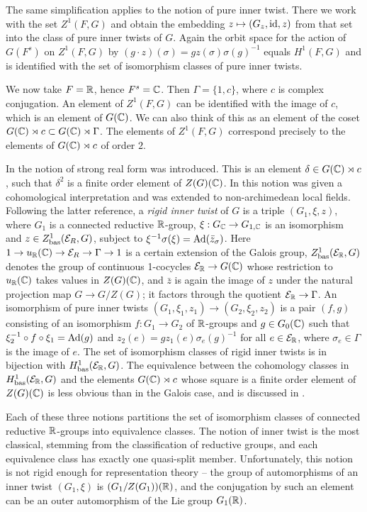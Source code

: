 \documentclass{article}
\theoremstyle{definition}
\numberwithin{equation}{section}
\renewcommand{\-}{\hyp{}}
\begin{document}
The same simplification applies to the notion of pure inner twist. There we work with the set $Z^1(F,G)$ and obtain the embedding $z \mapsto (G_z,\textrm{id},z)$ from that set into the class of pure inner twists of $G$. Again the orbit space for the action of $G(F^s)$ on $Z^1(F,G)$ by $(g\cdot z)(\sigma)=gz(\sigma)\sigma(g)^{-1}$ equals $H^1(F,G)$ and is identified with the set of isomorphism classes of pure inner twists.

We now take $F=\mathbb{R}$, hence $F^s=\mathbb{C}$. Then $\Gamma=\{1,c\}$, where $c$ is complex conjugation. An element of $Z^1(F,G)$ can be identified with the image of $c$, which is an element of $G(\mathbb{C})$. We can also think of this as an element of the coset $G(\mathbb{C}) \rtimes c \subset G(\mathbb{C}) \rtimes \Gamma$. The elements of $Z^1(F,G)$ correspond precisely to the elements of $G(\mathbb{C}) \rtimes c$ of order $2$.

In \cite{ABV92} the notion of strong real form was introduced. This is an element $\delta \in G(\mathbb{C}) \rtimes c$, such that $\delta^2$ is a finite order element of $Z(G)(\mathbb{C})$. In \cite{KalRI} this notion was given a cohomological interpretation and was extended to non-archimedean local fields. Following the latter reference, a \emph{rigid inner twist} of $G$ is a triple $(G_1,\xi,z)$, where $G_1$ is a connected reductive $\mathbb{R}$-group, $\xi : G_{\mathbb{C}} \to G_{1,\mathbb{C}}$ is an isomorphism and $z \in Z^1_{\textrm{bas}}(\mathcal{E}_R,G)$, subject to $\xi^{-1}\sigma(\xi)=\textrm{Ad}(\bar z_\sigma)$. Here $1 \to u_{\mathbb{R}}(\mathbb{C}) \to \mathcal{E}_R \to \Gamma \to 1$ is a certain extension of the Galois group, $Z^1_{\textrm{bas}}(\mathcal{E}_{\mathbb{R}},G)$ denotes the group of continuous 1-cocycles $\mathcal{E}_{\mathbb{R}} \to G(\mathbb{C})$ whose restriction to $u_{\mathbb{R}}(\mathbb{C})$ takes values in $Z(G)(\mathbb{C})$, and $\bar z$ is again the image of $z$ under the natural projection map $G \to G/Z(G)$; it factors through the quotient $\mathcal{E}_{\mathbb{R}} \to \Gamma$. An isomorphism of pure inner twists $(G_1,\xi_1,z_1) \to (G_2,\xi_2,z_2)$ is a pair $(f,g)$ consisting of an isomorphism $f : G_1 \to G_2$ of $\mathbb{R}$-groups and $g \in G_0(\mathbb{C})$ such that $\xi_2^{-1}\circ f \circ \xi_1=\textrm{Ad}(g)$ and $z_2(e)=gz_1(e)\sigma_e(g)^{-1}$ for all $e \in \mathcal{E}_{\mathbb{R}}$, where $\sigma_e \in \Gamma$ is the image of $e$. The set of isomorphism classes of rigid inner twists is in bijection with $H^1_{\textrm{bas}}(\mathcal{E}_{\mathbb{R}},G)$. The equivalence between the cohomology classes in $H^1_{\textrm{bas}}(\mathcal{E}_{\mathbb{R}},G)$ and the elements $G(\mathbb{C}) \rtimes c$ whose square is a finite order element of $Z(G)(\mathbb{C})$ is less obvious than in the Galois case, and is discussed in \cite[\S5.2]{KalRI}.

Each of these three notions partitions the set of isomorphism classes of connected reductive $\mathbb{R}$-groups into equivalence classes. The notion of inner twist is the most classical, stemming from the classification of reductive groups, and each equivalence class has exactly one quasi-split member. Unfortunately, this notion is not rigid enough for representation theory -- the group of automorphisms of an inner twist $(G_1,\xi)$ is $(G_1/Z(G_1))(\mathbb{R})$, and the conjugation by such an element can be an outer automorphism of the Lie group $G_1(\mathbb{R})$.
\end{document}
